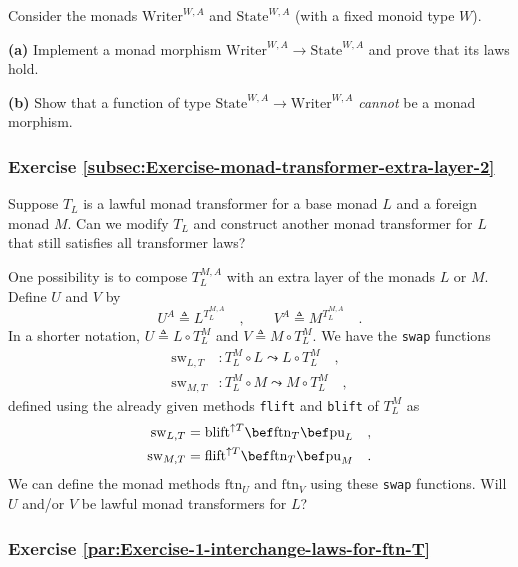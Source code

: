 Consider the monads $\text{Writer}^{W,A}$ and $\text{State}^{W,A}$
(with a fixed monoid type $W$). 

\textbf{(a)} Implement a monad morphism $\text{Writer}^{W,A}\rightarrow\text{State}^{W,A}$
and prove that its laws hold.

\textbf{(b)} Show that a function of type $\text{State}^{W,A}\rightarrow\text{Writer}^{W,A}$
\emph{cannot} be a monad morphism.

\subsubsection{Exercise \label{subsec:Exercise-monad-transformer-extra-layer-2}\ref{subsec:Exercise-monad-transformer-extra-layer-2} }

Suppose $T_{L}$ is a lawful monad transformer for a base monad $L$
and a foreign monad $M$. Can we modify $T_{L}$ and construct another
monad transformer for $L$ that still satisfies all transformer laws?

One possibility is to compose $T_{L}^{M,A}$ with an extra layer of
the monads $L$ or $M$. Define $U$ and $V$ by
\[
U^{A}\triangleq L^{T_{L}^{M,A}}\quad,\quad\quad V^{A}\triangleq M^{T_{L}^{M,A}}\quad.
\]
In a shorter notation, $U\triangleq L\circ T_{L}^{M}$ and $V\triangleq M\circ T_{L}^{M}$.
We have the \lstinline!swap! functions 
\begin{align*}
\text{sw}_{L,T} & :T_{L}^{M}\circ L\leadsto L\circ T_{L}^{M}\quad,\\
\text{sw}_{M,T} & :T_{L}^{M}\circ M\leadsto M\circ T_{L}^{M}\quad,
\end{align*}
defined using the already given methods \lstinline!flift! and \lstinline!blift!
of $T_{L}^{M}$ as
\begin{align*}
\text{sw}_{L,T} & =\text{blift}^{\uparrow T}\bef\text{ftn}_{T}\bef\text{pu}_{L}\quad,\\
\text{sw}_{M,T} & =\text{flift}^{\uparrow T}\bef\text{ftn}_{T}\bef\text{pu}_{M}\quad.
\end{align*}
We can define the monad methods $\text{ftn}_{U}$ and $\text{ftn}_{V}$
using these \lstinline!swap! functions. Will $U$ and/or $V$ be
lawful monad transformers for $L$? 

\subsubsection{Exercise \label{par:Exercise-1-interchange-laws-for-ftn-T}\ref{par:Exercise-1-interchange-laws-for-ftn-T}}

